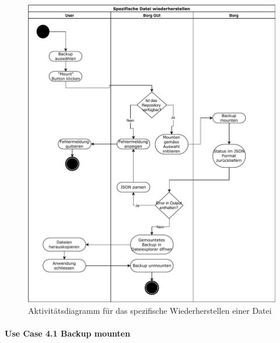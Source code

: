 \begin{figure}[htbp]
\centering
\includegraphics[width=.9\linewidth]{pictures/activity_mount.pdf}
\caption{\label{fig:orgbcf997e}
Aktivitätsdiagramm für das spezifische Wiederherstellen einer Datei}
\end{figure}
\newpage
\paragraph{Use Case 4.1 Backup mounten}
\label{sec:org0eb4e4f}

